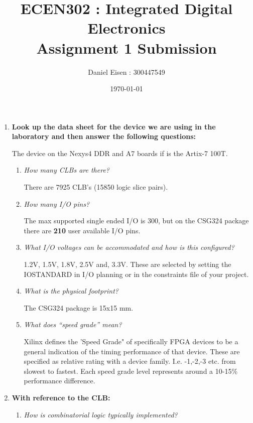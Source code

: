 \documentclass[11pt]{article}
\title{ECEN302 : Integrated Digital Electronics \\ Assignment 1 Submission}
\author{Daniel Eisen : 300447549}
\date{\today}
\begin{document}
\begin{preview}
\maketitle
\begin{enumerate}
    \item \textbf{Look up the data sheet for the device we are using in the laboratory and then answer the following questions:}

    The device on the Nexys4 DDR and A7 boards if is the Artix-7 100T.
  
    \begin{enumerate}
        \item \textit{How many CLBs are there?}

        There are 7925 CLB's  (15850 logic slice pairs).
    
        \item \textit{How many I/O pins?}

        The max supported single ended I/O is 300, but on the CSG324 package there are \textbf{210} user  available I/O pins. 

        \item \textit{What I/O voltages can be accommodated and how is this configured?}

        1.2V, 1.5V, 1.8V, 2.5V and, 3.3V. These are selected by setting the IOSTANDARD in I/O planning or in the constraints file of your project.
        
        \item \textit{What is the physical footprint?}

        The CSG324 package is 15x15 mm.~

        \item \textit{What does “speed grade” mean?}

        Xilinx defines the 'Speed Grade" of specifically FPGA devices to be a general indication of the timing performance of that device. These are specified as relative rating with a device family. I.e. -1,-2,-3 etc. from slowest to fastest.
        Each speed grade level represents around a 10-15\% performance difference.

    \end{enumerate}

    \item \textbf{With reference to the CLB:}
    \begin{enumerate}
        \item \textit{How is combinatorial logic typically implemented?}


\end{enumerate}
\end{enumerate}
\end{preview}
\end{document}
